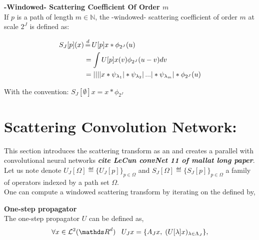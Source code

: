 \documentclass[a4paper,11pt]{report}
\begin{document}
{      \begin{defn} \textbf{-Windowed- Scattering Coefficient Of Order $m$}\\
				If $p$ is a path of length $m \in \mathds{N}$, the -windowed- scattering coefficient of order $m$ at scale $2^{J}$ is defined as:
				
				\begin{equation}
					\label{eq:ST windowed}
					\begin{split}
						S_{J}[p](x) &\eqdef U[p]x \ast \phi_{2^{J}}(u) \\
									&= \int U[p]x(v) \phi_{2^{J}}(u-v) dv \\
									&= \abs{\abs{\abs{\abs{x \ast \psi_{\lambda_{1}}} \ast \psi_{\lambda_{2}}} 
							...} \ast \psi_{\lambda_{m}}} \ast \phi_{2^{J}}(u)
					\end{split}
				\end{equation}
				
				With the convention: $S_{J}[\emptyset]x = x \ast \phi_{2^{J}}$\\
      	\label{def:SC windozed}
      \end{defn}


		\section{Scattering Convolution Network:}
			\label{seq:ST/SCN}
			
			This section introduces the scattering transform as an  and creates a parallel with convolutional neural networks \textbf{\textit{cite LeCun convNet 11 of mallat long paper}}. Let us note denote $U_{J}[\Omega] \eqdef \{U_{J}[p]\}_{p \in \Omega}$ and $S_{J}[\Omega] \eqdef \{S_{J}[p]\}_{p \in \Omega}$ a family of operators indexed by a path set $\Omega$.\\
			
			One can compute a windowed scattering transform by iterating on the  defined by,
			
			\begin{defn}  \textbf{One-step propagator}\\
				The one-step propagator $U$ can be defined as,
				\begin{equation}
					\forall x \in \mathcal{L}^{2}(\dsR^{d}) \;\;\; U_{J} x = \{ A_{J}x , \; (U[\lambda]x)_{\lambda \in \Lambda_{J}} \},
					\label{eq:One step propagator}
				\end{equation}
				

\end{defn}}
\end{document}
